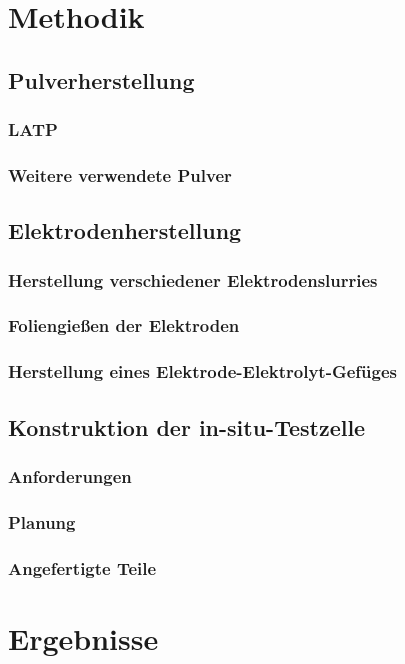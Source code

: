 \documentclass[a4paper, 11pt, headsepline,footsepline,twoside,abstract]{scrbook}
\begin{document}
\chapter{Methodik}
\section{Pulverherstellung}
\subsection{LATP}
\subsection{}
\subsection{Weitere verwendete Pulver}
\section{Elektrodenherstellung}
\subsection{Herstellung verschiedener Elektrodenslurries}
\subsection{Foliengießen der Elektroden}
\subsection{Herstellung eines Elektrode-Elektrolyt-Gefüges}
\section{Konstruktion der in-situ-Testzelle}
\subsection{Anforderungen}
\subsection{Planung}
\subsection{Angefertigte Teile}
\chapter{Ergebnisse}
\end{document}
